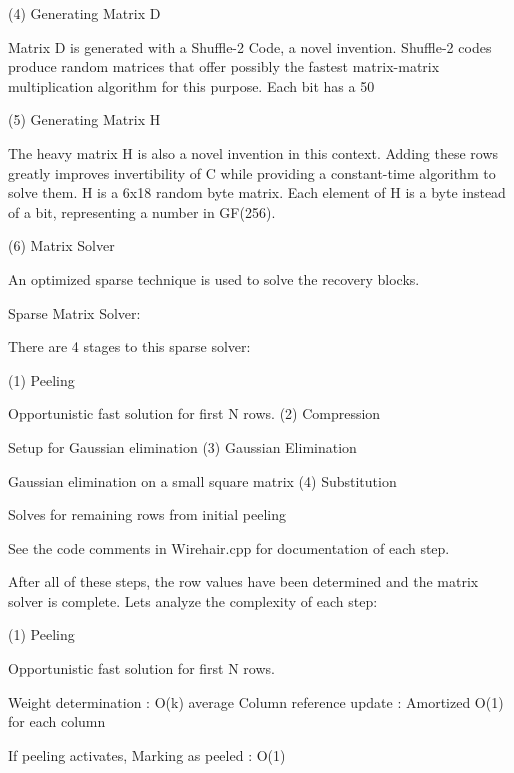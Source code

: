 (4) Generating Matrix D \begin{DoxyVerb}Matrix D is generated with a Shuffle-2 Code, a novel invention.
Shuffle-2 codes produce random matrices that offer possibly the
fastest matrix-matrix multiplication algorithm for this purpose.
Each bit has a 50%
\end{DoxyVerb}


(5) Generating Matrix H \begin{DoxyVerb}The heavy matrix H is also a novel invention in this context.
Adding these rows greatly improves invertibility of C while providing
a constant-time algorithm to solve them.
H is a 6x18 random byte matrix.
Each element of H is a byte instead of a bit, representing a number
in GF(256).
\end{DoxyVerb}


(6) Matrix Solver \begin{DoxyVerb}An optimized sparse technique is used to solve the recovery blocks.
\end{DoxyVerb}


 Sparse Matrix Solver\+:

There are 4 stages to this sparse solver\+:

(1) Peeling
\begin{DoxyItemize}
\item Opportunistic fast solution for first N rows. (2) Compression
\item Setup for Gaussian elimination (3) Gaussian Elimination
\item Gaussian elimination on a small square matrix (4) Substitution
\item Solves for remaining rows from initial peeling
\end{DoxyItemize}

See the code comments in Wirehair.\+cpp for documentation of each step.

After all of these steps, the row values have been determined and the matrix solver is complete. Let\textquotesingle{}s analyze the complexity of each step\+:

(1) Peeling
\begin{DoxyItemize}
\item Opportunistic fast solution for first N rows.
\end{DoxyItemize}

Weight determination \+: O(k) average Column reference update \+: Amortized O(1) for each column

If peeling activates, Marking as peeled \+: O(1)

